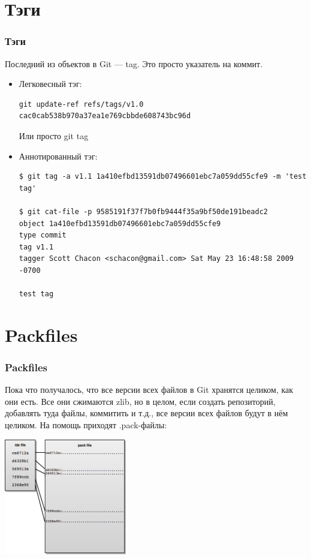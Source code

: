 \documentclass[xetex,mathserif,serif]{beamer}
\begin{document}
	\section{Тэги}

	\begin{frame}[fragile]
		\frametitle{Тэги}
		Последний из объектов в Git --- tag. Это просто указатель на коммит.
		\begin{footnotesize}
			\begin{itemize}
				\item Легковесный тэг:
					\begin{verbatim}
git update-ref refs/tags/v1.0 cac0cab538b970a37ea1e769cbbde608743bc96d
					\end{verbatim}
					Или просто git tag
				\item Аннотированный тэг:
					\begin{verbatim}
$ git tag -a v1.1 1a410efbd13591db07496601ebc7a059dd55cfe9 -m 'test tag'

$ git cat-file -p 9585191f37f7b0fb9444f35a9bf50de191beadc2
object 1a410efbd13591db07496601ebc7a059dd55cfe9
type commit
tag v1.1
tagger Scott Chacon <schacon@gmail.com> Sat May 23 16:48:58 2009 -0700

test tag
					\end{verbatim}
			\end{itemize}
		\end{footnotesize}
	\end{frame}

	\section{Packfiles}

	\begin{frame}[fragile]
		\frametitle{Packfiles}
		Пока что получалось, что все версии всех файлов в Git хранятся целиком, как они есть. Все они сжимаются zlib, но в целом, если создать репозиторий, добавлять туда файлы, коммитить и т.д., все версии всех файлов будут в нём целиком. На помощь приходят .pack-файлы:
		\begin{center}
			\includegraphics[width=0.4\textwidth]{gitPackFiles.png}
		\end{center}
	\end{frame}
\end{document}
